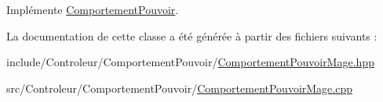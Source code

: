 Implémente \hyperlink{class_comportement_pouvoir_a8b8f4e753291ab73ab0016106f3948ff}{Comportement\-Pouvoir}.



La documentation de cette classe a été générée à partir des fichiers suivants \-:\begin{DoxyCompactItemize}
\item 
include/\-Controleur/\-Comportement\-Pouvoir/\hyperlink{_comportement_pouvoir_mage_8hpp}{Comportement\-Pouvoir\-Mage.\-hpp}\item 
src/\-Controleur/\-Comportement\-Pouvoir/\hyperlink{_comportement_pouvoir_mage_8cpp}{Comportement\-Pouvoir\-Mage.\-cpp}\end{DoxyCompactItemize}
